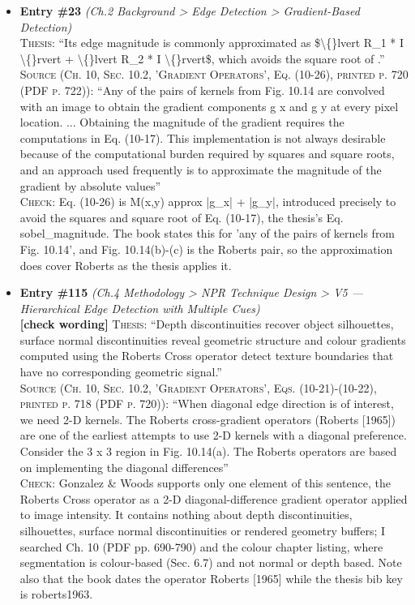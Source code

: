 \documentclass[11pt, a4paper]{article}
\begin{document}
\begin{itemize}[leftmargin=1.2em,itemsep=4pt]
\item \textbf{Entry \#23} \textit{(Ch.2 Background > Edge Detection > Gradient-Based Detection)}\\
\textsc{Thesis:} ``Its edge magnitude is commonly approximated as \$\textbackslash\{\}lvert R\_1 * I \textbackslash\{\}rvert + \textbackslash\{\}lvert R\_2 * I \textbackslash\{\}rvert\$, which avoids the square root of .''\\
\textsc{Source (Ch. 10, Sec. 10.2, 'Gradient Operators', Eq. (10-26), printed p. 720 (PDF p. 722)):} ``Any of the pairs of kernels from Fig. 10.14 are convolved with an image to obtain the gradient components g x and g y at every pixel location. ... Obtaining the magnitude of the gradient requires the computations in Eq. (10-17). This implementation is not always desirable because of the computational burden required by squares and square roots, and an approach used frequently is to approximate the magnitude of the gradient by absolute values''\\
\textsc{Check:} Eq. (10-26) is M(x,y) approx |g\_x| + |g\_y|, introduced precisely to avoid the squares and square root of Eq. (10-17), the thesis's Eq. sobel\_magnitude. The book states this for 'any of the pairs of kernels from Fig. 10.14', and Fig. 10.14(b)-(c) is the Roberts pair, so the approximation does cover Roberts as the thesis applies it.
\item \textbf{Entry \#115} \textit{(Ch.4 Methodology > NPR Technique Design > V5 — Hierarchical Edge Detection with Multiple Cues)}\\
\textcolor{partialorange}{\textbf{[check wording]}} \textsc{Thesis:} ``Depth discontinuities recover object silhouettes, surface normal discontinuities reveal geometric structure and colour gradients computed using the Roberts Cross operator detect texture boundaries that have no corresponding geometric signal.''\\
\textsc{Source (Ch. 10, Sec. 10.2, 'Gradient Operators', Eqs. (10-21)-(10-22), printed p. 718 (PDF p. 720)):} ``When diagonal edge direction is of interest, we need 2-D kernels. The Roberts cross-gradient operators (Roberts [1965]) are one of the earliest attempts to use 2-D kernels with a diagonal preference. Consider the 3 x 3 region in Fig. 10.14(a). The Roberts operators are based on implementing the diagonal differences''\\
\textsc{Check:} Gonzalez \& Woods supports only one element of this sentence, the Roberts Cross operator as a 2-D diagonal-difference gradient operator applied to image intensity. It contains nothing about depth discontinuities, silhouettes, surface normal discontinuities or rendered geometry buffers; I searched Ch. 10 (PDF pp. 690-790) and the colour chapter listing, where segmentation is colour-based (Sec. 6.7) and not normal or depth based. Note also that the book dates the operator Roberts [1965] while the thesis bib key is roberts1963.
\end{itemize}
\end{document}

